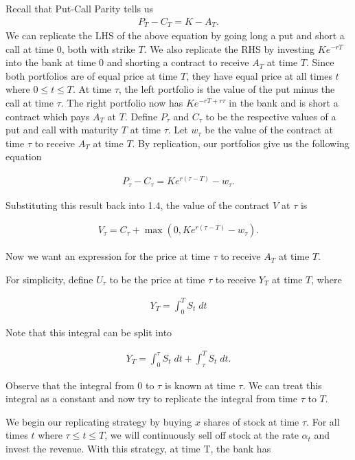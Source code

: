 \documentclass[reqno]{amsart}
\begin{document}
Recall that Put-Call Parity tells us
\begin{align}
     P_T - C_T = K - A_T. 
\end{align}
We can replicate the LHS of the above equation by going long a put and short a call at time $0$, both with strike $T$. 
We also replicate the RHS by investing $Ke^{-rT}$ into the bank at time 0 and shorting a contract to receive $A_T$ at time $T$. 
Since both portfolios are of equal price at time $T$, they have equal price at all times $t$ where $0 \leq t \leq T$. 
At time $\tau$, the left portfolio is the value of the put minus the call at time $\tau$. 
The right portfolio now has $Ke^{-rT + r\tau}$ in the bank and is short a contract which pays $A_T$ at $T$.
Define $P_\tau$ and $C_\tau$ to be the respective values of a put and call with maturity $T$ at time $\tau$.
Let $w_\tau$ be the value of the contract at time $\tau$ to receive $A_T$ at time $T$.
By replication, our portfolios give us the following equation

\begin{align}
     P_\tau - C_\tau = Ke^{r(\tau - T)} - w_\tau.
\end{align}

Substituting this result back into 1.4, the value of the contract $V$ at $\tau$ is

\begin{align}
     V_\tau = C_\tau + \max(0, Ke^{r(\tau - T)} - w_\tau).
\end{align}

Now we want an expression for the price at time $\tau$ to receive $A_T$ at time $T$. 

\newpage

For simplicity, define $U_\tau$ to be the price at time $\tau$ to receive $Y_T$ at time $T$, where

\begin{align}
     Y_T = \int_0^T S_t \; dt
\end{align}

Note that this integral can be split into

\begin{align}
     Y_T = \int_0^\tau S_t \; dt + \int_\tau^T S_t \; dt.
\end{align}

Observe that the integral from $0$ to $\tau$ is known at time $\tau$. We can treat this integral as a constant and now try to replicate the integral from time $\tau$ to $T$.

We begin our replicating strategy by buying $x$ shares of stock at time $\tau$. For all times $t$ where $\tau \leq t \leq T$, we will continuously sell off stock at the rate $\alpha_t$ and invest the revenue.
With this strategy, at time T, the bank has 
\end{document}
